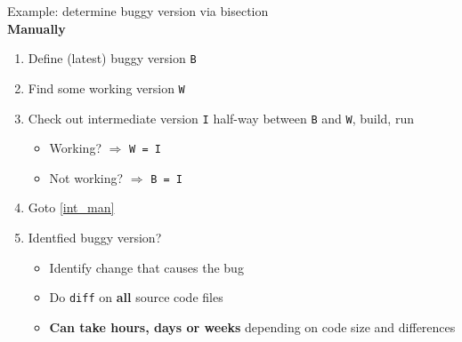 \begin{frame}[fragile]
\emptyframetitle

Example: determine buggy version via bisection\\[7pt]

\textbf{Manually}
\begin{enumerate}
  \item Define (latest) buggy version \texttt{B}
  \item Find some working version \texttt{W}
  \item Check out intermediate version \texttt{I} half-way between \texttt{B} and \texttt{W}, build, run\label{int_man}
  \begin{itemize}
    \normalsize
    \item Working? $\Rightarrow$ \texttt{W = I}
    \item Not working? $\Rightarrow$ \texttt{B = I}
  \end{itemize}
  \item Goto \ref{int_man}
  \item Identfied buggy version?
  \begin{itemize}
    \normalsize
    \item Identify change that causes the bug
    \item Do \texttt{diff} on \textbf{all} source code files
    \item \textbf{Can take hours, days or weeks} depending on code size and differences
  \end{itemize}
\end{enumerate}

\end{frame}

